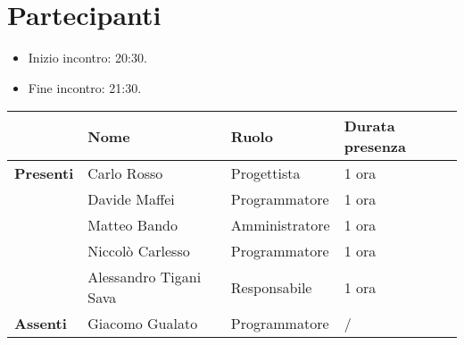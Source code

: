 \section*{Partecipanti}

\begin{itemize}
	\item Inizio incontro: 20:30.
	\item Fine incontro: 21:30.
\end{itemize}


\begin{center}
	\begin{tabular}{llll}
		                  & \textbf{Nome}          	& \textbf{Ruolo} 	& \textbf{Durata presenza} \\
		\hline
		\textbf{Presenti} & Carlo Rosso            	& Progettista    	& 1 ora                    \\
		                  & Davide Maffei          	& Programmatore   	& 1 ora                    \\
		                  & Matteo Bando           	& Amministratore 	& 1 ora                    \\
		                  & Niccolò Carlesso       	& Programmatore  	& 1 ora                    \\
						  & Alessandro Tigani Sava 	& Responsabile  	& 1 ora                    \\
		\hline
		\textbf{Assenti}  & Giacomo Gualato        	& Programmatore  	& /                        	\\
	\end{tabular}
\end{center}
